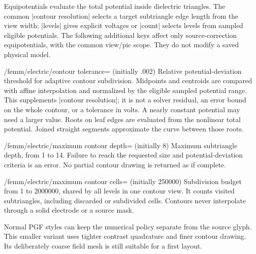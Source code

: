 Equipotentials evaluate the total potential inside dielectric triangles.
The common |contour resolution| selects a target subtriangle edge length from
the view width; |levels| gives explicit voltages or |count| selects levels
from sampled eligible potentials. The following additional keys affect only
source-correction equipotentials, with the common view/pic scope. They do not
modify a saved physical model.

\begin{key}{/femm/electric/contour tolerance= (initially .002)}
Relative potential-deviation threshold for adaptive contour subdivision.
Midpoints and centroids are compared with affine interpolation and normalized
by the eligible sampled potential range. This supplements |contour resolution|;
it is not a solver residual, an error bound on the whole contour, or a tolerance
in volts. A nearly constant potential may need a larger value. Roots on leaf
edges are evaluated from the nonlinear total potential. Joined straight
segments approximate the curve between those roots.
\end{key}
\begin{key}{/femm/electric/maximum contour depth= (initially 8)}
Maximum subtriangle depth, from 1 to 14. Failure to reach the requested size
and potential-deviation criteria is an error. No partial contour drawing is
returned as if complete.
\end{key}
\begin{key}{/femm/electric/maximum contour cells= (initially 250000)}
Subdivision budget from 1 to 2000000, shared by all levels in one contour view.
It counts visited subtriangles, including discarded or subdivided cells.
Contours never interpolate through a solid electrode or a source mask.
\end{key}

Normal PGF styles can keep the numerical policy separate from the source glyph.
This smaller variant uses tighter contrast quadrature and finer contour drawing.
Its deliberately coarse field mesh is still suitable for a first layout.

\Needspace{12cm}
\begin{codeexample}[width=0pt]
\end{codeexample}

